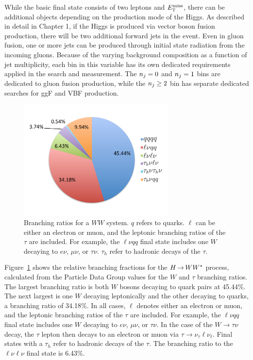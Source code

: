 While the basic final state consists of two leptons and $E_{\textrm{\footnotesize\sc t}}^{\rm miss}$, there can be additional objects depending on the production mode of the Higgs. As described in detail in Chapter 1, if the Higgs is produced via vector boson fusion production, there will be two additional forward jets in the event. Even in gluon fusion, one or more jets can be produced through initial state radiation from the incoming gluons. Because of the varying background composition as a function of jet multiplicity, each bin in this variable has its own dedicated requirements applied in the search and measurement. The $n_j = 0$ and $n_j = 1$ bins are dedicated to gluon fusion production, while the $n_j \geq 2$ bin has separate dedicated searches for ggF and VBF production. 

\begin{figure}[h!]
  \centering
  \captionsetup{justification=centering}
  \includegraphics[width=0.7\textwidth]{figures/WWBR}
  \caption{Branching ratios for a $WW$ system. $q$ refers to quarks. $\ell$ can be either an electron or muon, and the leptonic branching ratios of the $\tau$ are included. For example, the $\ell\nu qq$ final state includes one $W$ decaying to $e\nu$, $\mu \nu$, or $\tau \nu$. $\tau_h$ refer to hadronic decays of the $\tau$.}
  \label{fig:WWBR}
\end{figure}


Figure~\ref{fig:WWBR} shows the relative branching fractions for the $H{\,{\rightarrow}\,}WW^\ast$ process, calculated from the Particle Data Group values for the $W$ and $\tau$ branching ratios\cite{pdg}. The largest branching ratio is both $W$ bosons decaying to quark pairs at 45.44\%. The next largest is one $W$ decaying leptonically and the other decaying to quarks, a branching ratio of 34.18\%. In all cases, $\ell$ denotes either an electron or muon, and the leptonic branching ratios of the $\tau$ are included. For example, the $\ell\nu qq$ final state includes one $W$ decaying to $e\nu$, $\mu \nu$, or $\tau \nu$. In the case of the $W\to\tau\nu$ decay, the $\tau$ lepton then decays to an electron or muon via $\tau \to \nu_\tau \ell \nu_\ell$. Final states with a $\tau_h$ refer to hadronic decays of the $\tau$. The branching ratio to the $\ell\nu\ell\nu$ final state is 6.43\%. 

